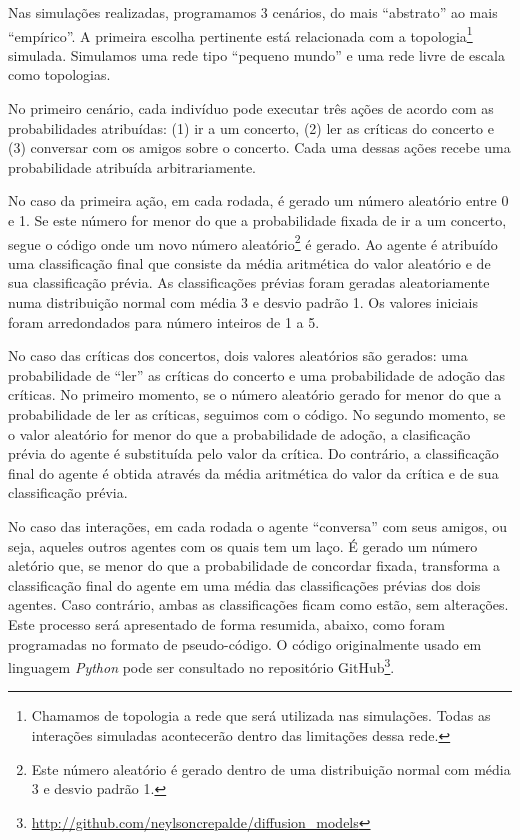 \documentclass[a4paper, 12pt, openright, oneside, german, french, english, brazil]{abntex2}
\begin{document}
	Nas simulações realizadas, programamos 3 cenários, do mais ``abstrato'' ao mais ``empírico''. A primeira escolha pertinente está relacionada com a topologia\footnote{Chamamos de topologia a rede que será utilizada nas simulações. Todas as interações simuladas acontecerão dentro das limitações dessa rede.} simulada. Simulamos uma rede tipo ``pequeno mundo'' e uma rede livre de escala como topologias.
	
	No primeiro cenário, cada indivíduo pode executar três ações de acordo com as probabilidades atribuídas: (1) ir a um concerto, (2) ler as críticas do concerto e (3) conversar com os amigos sobre o concerto. Cada uma dessas ações recebe uma probabilidade atribuída arbitrariamente. 
	
	No caso da primeira ação, em cada rodada, é gerado um número aleatório entre 0 e 1. Se este número for menor do que a probabilidade fixada de ir a um concerto, segue o código onde um novo número aleatório\footnote{Este número aleatório é gerado dentro de uma distribuição normal com média 3 e desvio padrão 1.} é gerado. Ao agente é atribuído uma classificação final que consiste da média aritmética do valor aleatório e de sua classificação prévia. As classificações prévias foram geradas aleatoriamente numa distribuição normal com média 3 e desvio padrão 1. Os valores iniciais foram arredondados para número inteiros de 1 a 5.
	
	No caso das críticas dos concertos, dois valores aleatórios são gerados: uma probabilidade de ``ler'' as críticas do concerto e uma probabilidade de adoção das críticas. No primeiro momento, se o número aleatório gerado for menor do que a probabilidade de ler as críticas, seguimos com o código. No segundo momento, se o valor aleatório for menor do que a probabilidade de adoção, a clasificação prévia do agente é substituída pelo valor da crítica. Do contrário, a classificação final do agente é obtida através da média aritmética do valor da crítica e de sua classificação prévia.
	
	No caso das interações, em cada rodada o agente ``conversa'' com seus amigos, ou seja, aqueles outros agentes com os quais tem um laço. É gerado um número aletório que, se menor do que a probabilidade de concordar fixada, transforma a classificação final do agente em uma média das classificações prévias dos dois agentes. Caso contrário, ambas as classificações ficam como estão, sem alterações. Este processo será apresentado de forma resumida, abaixo, como foram programadas no formato de pseudo-código. O código originalmente usado em linguagem \textit{Python} pode ser consultado no repositório GitHub\footnote{\url{http://github.com/neylsoncrepalde/diffusion_models}}.
	
\end{document}
